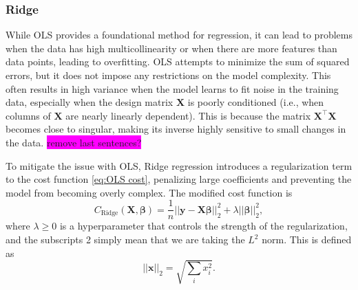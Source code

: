 \documentclass[aps,pra,english,notitlepage,reprint,nofootinbib]{revtex4-1}  %
\begin{document}


\subsubsection{Ridge}\label{subsubsec:ridge} 
While OLS provides a foundational method for regression, it can lead to problems when the data has high multicollinearity or when there are more features than data points, leading to overfitting. OLS attempts to minimize the sum of squared errors, but it does not impose any restrictions on the model complexity. This often results in high variance when the model learns to fit noise in the training data, especially when the design matrix $\mathbf{X}$ is poorly conditioned (i.e., when columns of $\mathbf{X}$ are nearly linearly dependent). This is because the matrix $\mathbf{X}^\top \mathbf{X}$ becomes close to singular, making its inverse highly sensitive to small changes in the data. \colorbox{magenta}{remove last sentences?}

To mitigate the issue with OLS, Ridge regression introduces a regularization term to the cost function \eqref{eq:OLS cost}, penalizing large coefficients and preventing the model from becoming overly complex. The modified cost function is
\begin{equation}
  C_{\text{Ridge}}(\mathbf{X},\boldsymbol{\beta}) = \frac{1}{n}\left|\left|\mathbf{y}-\mathbf{X}\boldsymbol{\beta} \right|\right|_2^2 + \lambda \left|\left|\boldsymbol{\beta}\right|\right|_2^2,
\end{equation}
where $\lambda \geq 0$ is a hyperparameter that controls the strength of the regularization, and the subscripts 2 simply mean that we are taking the $L^2$ norm. This is defined as
\begin{equation*}
  \left|\left|\mathbf{x}\right|\right|_2 = \sqrt{\sum_ix_i^2}.
\end{equation*}
\end{document}
